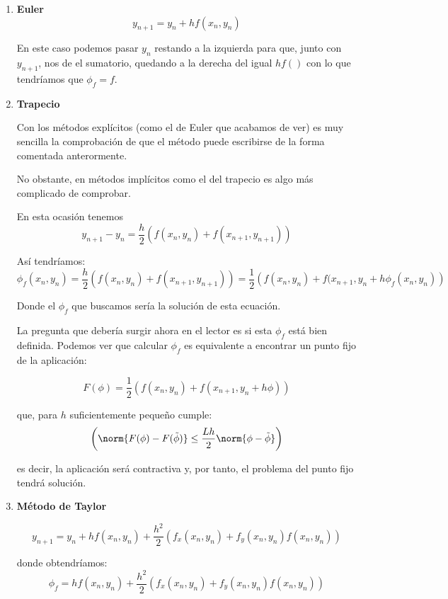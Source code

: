 \documentclass{apuntes}
\begin{document}
\begin{example}
\begin{enumerate}
\item \textbf{Euler}
\[y_{n+1} = y_n+hf(x_n,y_n)\]

En este caso podemos pasar $y_n$ restando a la izquierda para que, junto con $y_{n+1}$, nos de el sumatorio, quedando a la derecha del igual $hf()$ con lo que tendríamos que $\phi_f=f$.

\item \textbf{Trapecio}

Con los métodos explícitos (como el de Euler que acabamos de ver) es muy sencilla la comprobación de que el método puede escribirse de la forma comentada anterormente.

No obstante, en métodos implícitos como el del trapecio es algo más complicado de comprobar.

En esta ocasión tenemos
\[y_{n+1}-y_n = \frac{h}{2}\left(f(x_n,y_n)+f(x_{n+1},y_{n+1}) \right)\]

Así tendríamos:
\[\phi_f (x_n,y_n) = \frac{h}{2}\left(f(x_n,y_n)+f(x_{n+1},y_{n+1}) \right) = \frac{1}{2}\left( f(x_n,y_n) + f(x_{n+1},y_n+h\phi_f(x_n,y_n)\right)\]

Donde el $\phi_f$ que buscamos sería la solución de esta ecuación.

La pregunta que debería surgir ahora en el lector es si esta $\phi_f$ está bien definida. Podemos ver que calcular $\phi_f$ es equivalente a encontrar un punto fijo de la aplicación:

\[F(\phi) = \frac{1}{2} \left(f(x_n,y_n)+f(x_{n+1},y_n+h\phi)\right)\]

que, para $h$ suficientemente pequeño cumple:
\begin{equation}
	\label{eq:F_contractiva}
	\left(\norm{F(\phi)-F(\tilde{\phi})} \leq \frac{Lh}{2}\norm{\phi- \tilde{\phi}}\right)
\end{equation}

es decir, la aplicación será contractiva y, por tanto, el problema del punto fijo tendrá solución.

\item \textbf{Método de Taylor}

\[y_{n+1}=y_n+hf(x_n,y_n)+\frac{h^2}{2}\left(f_x(x_n,y_n)+f_y(x_n,y_n)f(x_n,y_n)\right)\]

donde obtendríamos:
\[\phi_f = hf(x_n,y_n)+\frac{h^2}{2}\left(f_x(x_n,y_n)+f_y(x_n,y_n)f(x_n,y_n)\right)\]
\end{enumerate}
\end{example}
\end{document}

